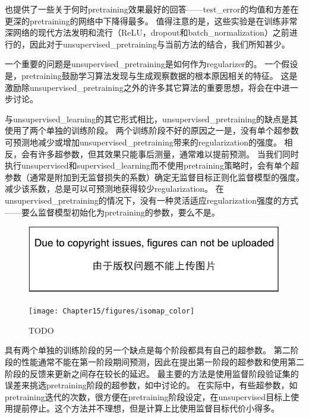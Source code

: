 \cite{Erhan+al-2010-small}也提供了一些关于何时\gls{pretraining}效果最好的回答——\gls{test_error}的均值和方差在更深的\gls{pretraining}的网络中下降得最多。
值得注意的是，这些实验是在训练非常深网络的现代方法发明和流行（\gls{ReLU}，\gls{dropout}和\gls{batch_normalization}）之前进行的，因此对于\gls{unsupervised_pretraining}与当前方法的结合，我们所知甚少。


一个重要的问题是\gls{unsupervised_pretraining}是如何作为\gls{regularizer}的。
一个假设是，\gls{pretraining}鼓励学习算法发现与生成观察数据的根本原因相关的特征。
这是激励除\gls{unsupervised_pretraining}之外的许多其它算法的重要思想，将会在中进一步讨论。


与\gls{unsupervised_learning}的其它形式相比，\gls{unsupervised_pretraining}的缺点是其使用了两个单独的训练阶段。
两个训练阶段不好的原因之一是，没有单个超参数可预测地减少或增加\gls{unsupervised_pretraining}带来的\gls{regularization}的强度。
相反，会有许多超参数，但其效果只能事后测量，通常难以提前预测。
当我们同时执行\gls{unsupervised}和\gls{supervised_learning}而不使用\gls{pretraining}策略时，会有单个超参数（通常是附加到无监督损失的系数）确定无监督目标正则化监督模型的强度。
减少该系数，总是可以可预测地获得较少\gls{regularization}。
在\gls{unsupervised_pretraining}的情况下，没有一种灵活适应\gls{regularization}强度的方式——要么监督模型初始化为\gls{pretraining}的参数，要么不是。


\begin{figure}[!htb]
\ifOpenSource
\centerline{\includegraphics{figure.pdf}}
\else
\centerline{\texttt{[image: Chapter15/figures/isomap\_color]}}
\fi
\caption{TODO}
\label{fig:chap15_isomap}
\end{figure}


具有两个单独的训练阶段的另一个缺点是每个阶段都具有自己的超参数。
第二阶段的性能通常不能在第一阶段期间预测，因此在提出第一阶段的超参数和使用第二阶段的反馈来更新之间存在较长的延迟。
最主要的方法是使用监督阶段验证集的误差来挑选\gls{pretraining}阶段的超参数，如\cite{Larochelle-jmlr-2009}中讨论的。
在实际中，有些超参数，如\gls{pretraining}迭代的次数，很方便在\gls{pretraining}阶段设定，在\gls{unsupervised}目标上使用提前停止。这个方法并不理想，但是计算上比使用监督目标代价小得多。

